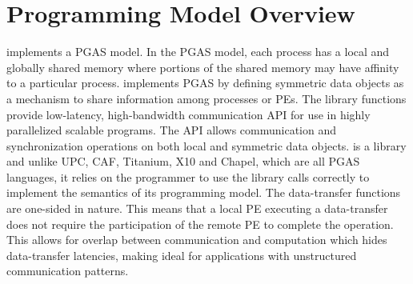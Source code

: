 \section{Programming Model Overview}
\openshmem implements a \ac{PGAS} model. In the \ac{PGAS} model, each process has a local and 
globally shared memory where portions of the shared memory may have affinity to a particular process. 
\openshmem implements \ac{PGAS} by defining symmetric data objects as a mechanism to share information among \openshmem processes or \acp{PE}. 
The \openshmem library functions provide low-latency, high-bandwidth communication \ac{API} for  use  in  highly  parallelized 
scalable programs. The \ac{API} allows communication and synchronization operations on both local and symmetric data objects. 
\openshmem is a library and unlike UPC, CAF, Titanium, X10 and Chapel, which are all
PGAS languages, it relies on the programmer to use the library calls correctly to implement the semantics of its programming model.
The \openshmem data-transfer functions are one-sided in nature. This means that a local \ac{PE} executing a data-transfer does not require the participation of the remote \ac{PE} to complete the operation. This allows for overlap between communication and computation which hides data-transfer latencies, making \openshmem ideal for applications with unstructured communication patterns.



